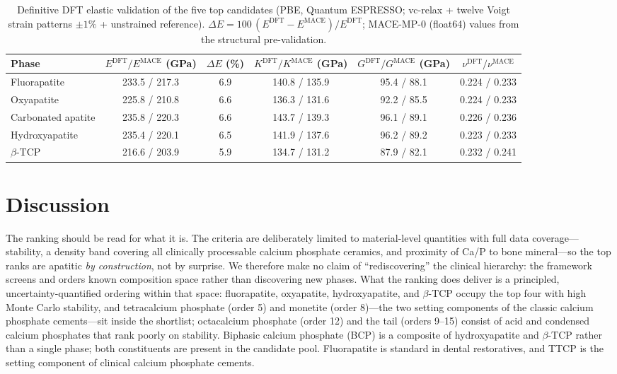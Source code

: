 \documentclass[review,11pt,a4paper]{elsarticle}
\begin{document}
\begin{table}[ht]
\centering\small
\caption{Definitive DFT elastic validation of the five top candidates (PBE, Quantum ESPRESSO; vc-relax + twelve Voigt strain patterns $\pm1\%$ + unstrained reference). $\Delta E=100\,(E^{\mathrm{DFT}}-E^{\mathrm{MACE}})/E^{\mathrm{DFT}}$; MACE-MP-0 (float64) values from the structural pre-validation.}
\label{tab:dft_elastik}
\begin{tabular}{lccccc}
\toprule
Phase & $E^{\mathrm{DFT}}/E^{\mathrm{MACE}}$ (GPa) & $\Delta E$ (\%) & $K^{\mathrm{DFT}}/K^{\mathrm{MACE}}$ (GPa) & $G^{\mathrm{DFT}}/G^{\mathrm{MACE}}$ (GPa) & $\nu^{\mathrm{DFT}}/\nu^{\mathrm{MACE}}$ \\
\midrule
Fluorapatite & 233.5 / 217.3 & 6.9 & 140.8 / 135.9 & 95.4 / 88.1 & 0.224 / 0.233 \\
Oxyapatite & 225.8 / 210.8 & 6.6 & 136.3 / 131.6 & 92.2 / 85.5 & 0.224 / 0.233 \\
Carbonated apatite & 235.8 / 220.3 & 6.6 & 143.7 / 139.3 & 96.1 / 89.1 & 0.226 / 0.236 \\
Hydroxyapatite & 235.4 / 220.1 & 6.5 & 141.9 / 137.6 & 96.2 / 89.2 & 0.223 / 0.233 \\
$\beta$-TCP & 216.6 / 203.9 & 5.9 & 134.7 / 131.2 & 87.9 / 82.1 & 0.232 / 0.241 \\
\bottomrule
\end{tabular}
\end{table}


\section{Discussion}\label{sec:diskusi}

The ranking should be read for what it is. The criteria are deliberately limited to material-level quantities with full data coverage---stability, a density band covering all clinically processable calcium phosphate ceramics, and proximity of Ca/P to bone mineral---so the top ranks are apatitic \emph{by construction}, not by surprise. We therefore make no claim of ``rediscovering'' the clinical hierarchy: the framework screens and orders known composition space rather than discovering new phases. What the ranking does deliver is a principled, uncertainty-quantified ordering within that space: fluorapatite, oxyapatite, hydroxyapatite, and $\beta$-TCP occupy the top four with high Monte Carlo stability, and tetracalcium phosphate (order 5) and monetite (order 8)---the two setting components of the classic calcium phosphate cements---sit inside the shortlist; octacalcium phosphate (order 12) and the tail (orders 9--15) consist of acid and condensed calcium phosphates that rank poorly on stability. Biphasic calcium phosphate (BCP) is a composite of hydroxyapatite and $\beta$-TCP rather than a single phase; both constituents are present in the candidate pool. Fluorapatite is standard in dental restoratives, and TTCP is the setting component of clinical calcium phosphate cements.
\end{document}

